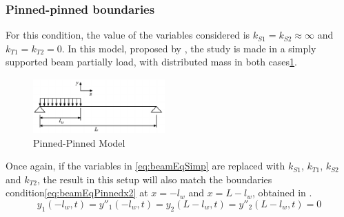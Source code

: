     \subsubsection{Pinned-pinned boundaries}
    For this condition, the value of the variables considered is $k_{S1}=k_{S2}\approx\infty$ and $k_{T1}=k_{T2}=0$. In this model, proposed by \citeauthor{chanFREEVIBRATIONSIMPLY1996}, the study is made in a simply supported beam partially load, with distributed mass in both cases\ref{fig:pinnedpinnedmodel}.
    \begin{figure}[!htb]
        \centering
        \includegraphics[width=0.45\textwidth]{Chapters/2CHP/Diagrams/pinnedpinnedmodel.pdf}
        \caption{Pinned-Pinned Model\cite{chanFREEVIBRATIONSIMPLY1996}}
        \label{fig:pinnedpinnedmodel}
    \end{figure}
    Once again, if the variables in \ref{eq:beamEqSimp} are replaced with $k_{S1}$, $k_{T1}$, $k_{S2}$ and $k_{T2}$, the result in this setup will also match the boundaries condition\ref{eq:beamEqPinnedx2} at $x=-l_w$ and $x=L-l_w$, obtained in \cite{chanFREEVIBRATIONSIMPLY1996}.
    \begin{equation} \label{eq:beamEqPinnedx2}
        y_1(-l_w,t) = y''_1(-l_w,t) = y_2(L-l_w,t) = y''_2(L-l_w,t)=0
    \end{equation}
